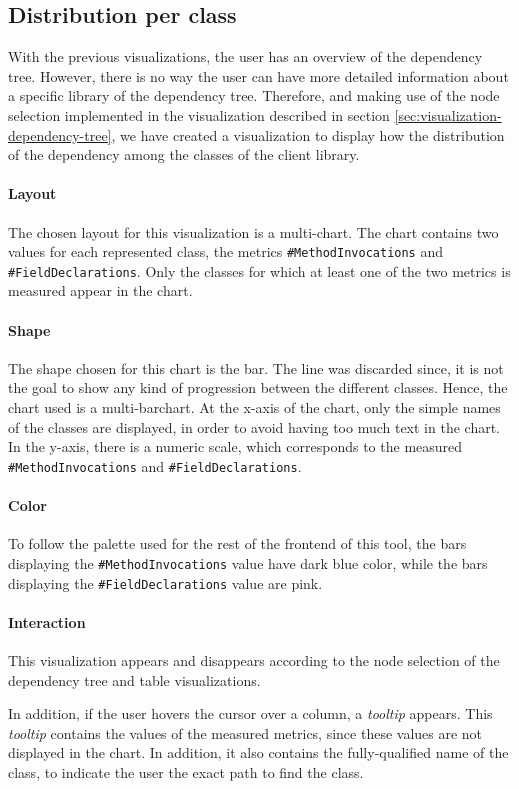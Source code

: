 \subsection{Distribution per class}
With the previous visualizations, the user has an overview of the dependency tree. However, there is no way the user can have more detailed information about a specific library of the dependency tree. Therefore, and making use of the node selection implemented in the visualization described in section \ref{sec:visualization-dependency-tree}, we have created a visualization to display how the distribution of the dependency among the classes of the client library.

\paragraph{Layout}
The chosen layout for this visualization is a multi-chart. The chart contains two values for each represented class, the metrics \texttt{#MethodInvocations} and \texttt{#FieldDeclarations}.
Only the classes for which at least one of the two metrics is measured appear in the chart.

\paragraph{Shape}
The shape chosen for this chart is the bar. The line was discarded since, it is not the goal to show any kind of progression between the different classes. Hence, the chart used is a multi-barchart.
At the x-axis of the chart, only the simple names of the classes are displayed, in order to avoid having too much text in the chart. In the y-axis, there is a numeric scale, which corresponds to the measured \texttt{#MethodInvocations} and \texttt{#FieldDeclarations}.

\paragraph{Color}
To follow the palette used for the rest of the frontend of this tool, the bars displaying the \texttt{#MethodInvocations} value have dark blue color, while the bars displaying the \texttt{#FieldDeclarations} value are pink.

\paragraph{Interaction}
This visualization appears and disappears according to the node selection of the dependency tree and table visualizations.

In addition, if the user hovers the cursor over a column, a \textit{tooltip} appears. This \textit{tooltip} contains the values of the measured metrics, since these values are not displayed in the chart. In addition, it also contains the fully-qualified name of the class, to indicate the user the exact path to find the class.
